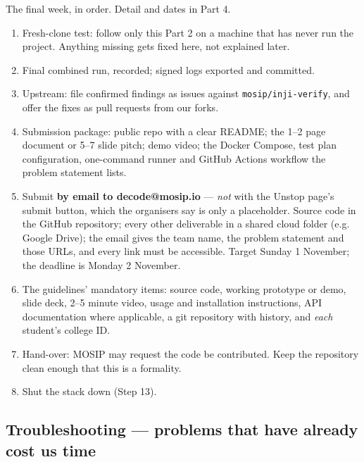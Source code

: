 \documentclass[10pt,a4paper]{article}
\newcommand{\tightlist}{\setlength{\itemsep}{1pt}\setlength{\parskip}{0pt}\setlength{\parsep}{0pt}}
\begin{document}
The final week, in order. Detail and dates in Part 4.

\begin{enumerate}\tightlist
  \item Fresh-clone test: follow only this Part 2 on a machine that has never run the
        project. Anything missing gets fixed here, not explained later.
  \item Final combined run, recorded; signed logs exported and committed.
  \item Upstream: file confirmed findings as issues against \texttt{mosip/inji-verify},
        and offer the fixes as pull requests from our forks.
  \item Submission package: public repo with a clear README; the 1--2 page document or
        5--7 slide pitch; demo video; the Docker Compose, test plan configuration,
        one-command runner and GitHub Actions workflow the problem statement lists.
  \item Submit \textbf{by email to decode@mosip.io} --- \emph{not} with the Unstop page's submit
        button, which the organisers say is only a placeholder. Source code in the GitHub
        repository; every other deliverable in a shared cloud folder (e.g. Google Drive); the
        email gives the team name, the problem statement and those URLs, and every link must
        be accessible. Target Sunday 1 November; the deadline is Monday 2 November.
  \item The guidelines' mandatory items: source code, working prototype or demo, slide deck,
        2--5 minute video, usage and installation instructions, API documentation where
        applicable, a git repository with history, and \emph{each} student's college ID.
  \item Hand-over: MOSIP may request the code be contributed. Keep the repository
        clean enough that this is a formality.
  \item Shut the stack down (Step 13).
\end{enumerate}

\subsection{Troubleshooting --- problems that have already cost us time}
\end{document}
